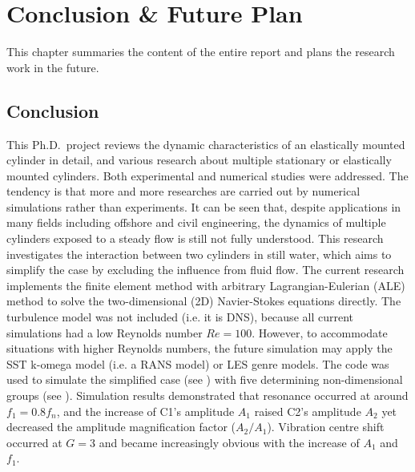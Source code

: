 \chapter{Conclusion \& Future Plan} \label{cha summary}
 \graphicspath{{Figs/}}
 
%

This chapter summaries the content of the entire report and plans the research work in the future.

\section{Conclusion}
This Ph.D.\ project reviews the dynamic characteristics of an elastically mounted cylinder in detail, and various research about multiple stationary or elastically mounted cylinders. Both experimental and numerical studies were addressed. The tendency is that more and more researches are carried out by numerical simulations rather than experiments. It can be seen that, despite applications in many fields including offshore and civil engineering, the dynamics of multiple cylinders exposed to a steady flow is still not fully understood. This research investigates the interaction between two cylinders in still water, which aims to simplify the case by excluding the influence from fluid flow. The current research implements the finite element method with arbitrary Lagrangian-Eulerian (ALE) method to solve the two-dimensional (2D) Navier-Stokes equations directly. The turbulence model was not included (i.e. it is DNS), because all current simulations had a low Reynolds number $ Re=100 $. However, to accommodate situations with higher Reynolds numbers, the future simulation may apply the SST k-omega model (i.e. a RANS model) or LES genre models. The code was used to simulate the simplified case (see ) with five determining non-dimensional groups (see ). Simulation results demonstrated that resonance occurred at around $ f_1=0.8f_n $, and the increase of C1's amplitude $ A_1 $ raised C2's amplitude $ A_2 $ yet decreased the amplitude magnification factor ($ A_2/A_1 $). Vibration centre shift occurred at $ G=3 $ and became increasingly obvious with the increase of $ A_1 $ and $ f_1 $.

